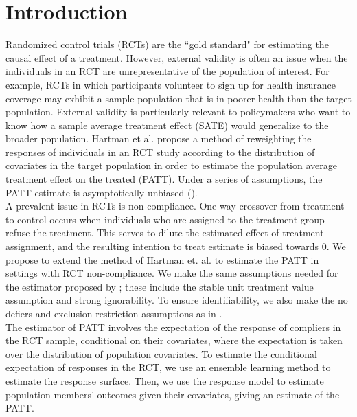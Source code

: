 \documentclass[12pt]{article}
\begin{document}
    
\maketitle  


\vspace{20mm}

\section{Introduction}
Randomized control trials (RCTs) are the ``gold standard" for estimating the causal effect of a treatment.  However, external validity is often an issue when the individuals in an RCT are unrepresentative of the population of interest.  For example, RCTs in which participants volunteer to sign up for health insurance coverage may exhibit a sample population that is in poorer health than the target population.  External validity is particularly relevant to policymakers who want to know how a sample average treatment effect (SATE) would generalize to the broader population. Hartman et al. propose a method of reweighting the responses of individuals in an RCT study according to the distribution of covariates in the target population in order to estimate the population average treatment effect on the treated (PATT).  Under a series of assumptions, the PATT estimate is asymptotically unbiased (\cite{Hartman}). \\

A prevalent issue in RCTs is non-compliance.  One-way crossover from treatment to control occurs when individuals who are assigned to the treatment group refuse the treatment.  This serves to dilute the estimated effect of treatment assignment, and the resulting intention to treat estimate is biased towards $0$.  We propose to extend the method of Hartman et. al. to estimate the PATT in settings with RCT non-compliance.  We make the same assumptions needed for the estimator proposed by \cite{Hartman}; these include the stable unit treatment value assumption and strong ignorability.  To ensure identifiability, we also make the no defiers and exclusion restriction assumptions as in \cite{Angrist1996}. \\

The estimator of PATT involves the expectation of the response of compliers in the RCT sample, conditional on their covariates, where the expectation is taken over the distribution of population covariates.  To estimate the conditional expectation of responses in the RCT, we use an ensemble learning method to estimate the response surface.  Then, we use the response model to estimate population members' outcomes given their covariates, giving an estimate of the PATT. \\
\end{document}
